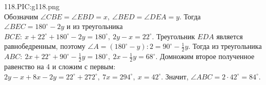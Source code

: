 118.{{PIC:g118.png}}\\
Обозначим $\angle CBE=\angle EBD=x,\ \angle BED=\angle DEA=y.$ Тогда $\angle BEC=180^\circ-2y$ и из треугольника $BCE:\ x+22^\circ+180^\circ-2y=180^\circ,\ 2y-x=22^\circ.$ Треугольник $EDA$ является равнобедренным, поэтому $\angle A=(180^\circ-y):2=90^\circ-\frac{1}{2}y.$ Тогда из треугольника $ABC:\ 2x+22^\circ+90^\circ-\frac{1}{2}y=180^\circ,\ 2x-\frac{1}{2}y=68^\circ.$ Домножим второе полученное равенство на 4 и сложим с первым: $2y-x+8x-2y=22^\circ+272^\circ,\ 7x=294^\circ,\ x=42^\circ.$ Значит, $\angle ABC=2\cdot42^\circ=84^\circ.$\\
